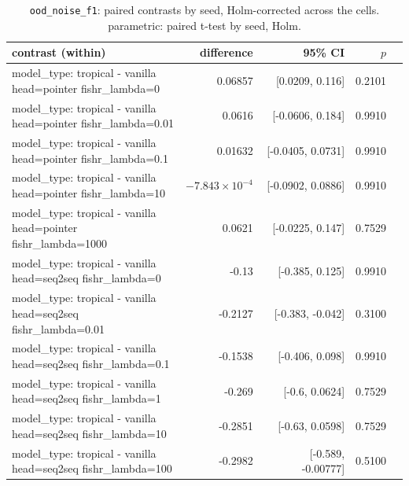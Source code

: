 \documentclass[10pt]{article}
\makeatletter
\newcommand{\stackcell}[1]{\begin{tabular}[t]{@{}l@{}}#1\end{tabular}}
\makeatother
\begin{document}
{\small
\begin{longtable}{lrrrl}
\caption{\texttt{ood\_noise\_f1}: paired contrasts by seed, Holm-corrected across the cells. parametric: paired t-test by seed, Holm.}\label{tab:paired-ood_noise_f1}\\
\toprule
contrast (within) & difference & 95\% CI & $p$ & \\
\midrule
\endhead
\stackcell{model\_type: tropical - vanilla\\\footnotesize head=pointer fishr\_lambda=0 } & 0.06857 & [0.0209, 0.116] & 0.2101 & \\
\stackcell{model\_type: tropical - vanilla\\\footnotesize head=pointer fishr\_lambda=0.01 } & 0.0616 & [-0.0606, 0.184] & 0.9910 & \\
\stackcell{model\_type: tropical - vanilla\\\footnotesize head=pointer fishr\_lambda=0.1 } & 0.01632 & [-0.0405, 0.0731] & 0.9910 & \\
\stackcell{model\_type: tropical - vanilla\\\footnotesize head=pointer fishr\_lambda=10 } & $-7.843\times10^{-4}$ & [-0.0902, 0.0886] & 0.9910 & \\
\stackcell{model\_type: tropical - vanilla\\\footnotesize head=pointer fishr\_lambda=1000 } & 0.0621 & [-0.0225, 0.147] & 0.7529 & \\
\stackcell{model\_type: tropical - vanilla\\\footnotesize head=seq2seq fishr\_lambda=0 } & -0.13 & [-0.385, 0.125] & 0.9910 & \\
\stackcell{model\_type: tropical - vanilla\\\footnotesize head=seq2seq fishr\_lambda=0.01 } & -0.2127 & [-0.383, -0.042] & 0.3100 & \\
\stackcell{model\_type: tropical - vanilla\\\footnotesize head=seq2seq fishr\_lambda=0.1 } & -0.1538 & [-0.406, 0.098] & 0.9910 & \\
\stackcell{model\_type: tropical - vanilla\\\footnotesize head=seq2seq fishr\_lambda=1 } & -0.269 & [-0.6, 0.0624] & 0.7529 & \\
\stackcell{model\_type: tropical - vanilla\\\footnotesize head=seq2seq fishr\_lambda=10 } & -0.2851 & [-0.63, 0.0598] & 0.7529 & \\
\stackcell{model\_type: tropical - vanilla\\\footnotesize head=seq2seq fishr\_lambda=100 } & -0.2982 & [-0.589, -0.00777] & 0.5100 & \\

\end{longtable}}
\end{document}
